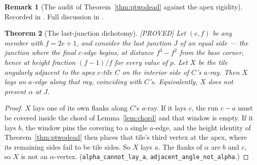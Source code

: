 \documentclass[11pt,reqno]{amsart}
\theoremstyle{plain}
\newtheorem{theorem}{Theorem}
\theoremstyle{definition}
\newtheorem{remark}[theorem]{Remark}
\newcommand{\lab}[1]{\hfill\textnormal{\footnotesize\textsc{[#1]}}}
\begin{document}
\begin{remark}[The audit of Theorem~\ref{thm:ptwodead} against the apex rigidity]\label{rem:ptwoaudit}
Recorded in \cite{Obstructions}. Full discussion in \cite{Obstructions}.
\end{remark}


\begin{theorem}[The last-junction dichotomy]\label{thm:lastjunction}\lab{PROVED}
Let $(e,f)$ be any member with $f=2e+1$, and consider the last junction $J$ of an equal side --- the
junction where the final $c$-edge begins, at distance $f^3-f^2$ from the base corner, hence at height
fraction $(f-1)/f$ for every value of $p$. Let $X$ be the tile angularly adjacent to the apex
$c$-tile $C$ on the interior side of $C$'s $a$-ray. Then $X$ lays an $a$-edge along that ray,
coinciding with $C$'s. Equivalently, \emph{$X$ does not present $\alpha$ at $J$}.
\end{theorem}

\begin{proof}
$X$ lays one of its own flanks along $C$'s $a$-ray. If it lays $c$, the run $c-a$ must be covered
inside the chord of Lemma~\ref{lem:chord} and that window is empty. If it lays $b$, the window pins
the covering to a single $a$-edge, and the height identity of Theorem~\ref{thm:ptwodead} then places
that tile's third vertex at the apex, where its remaining sides fail to be tile sides. So $X$ lays
$a$. The flanks of $\alpha$ are $b$ and $c$, so $X$ is not an $\alpha$-vertex.
\textup{(}\texttt{alpha\_cannot\_lay\_a}, \texttt{adjacent\_angle\_not\_alpha}.\textup{)}
\end{proof}
\end{document}
